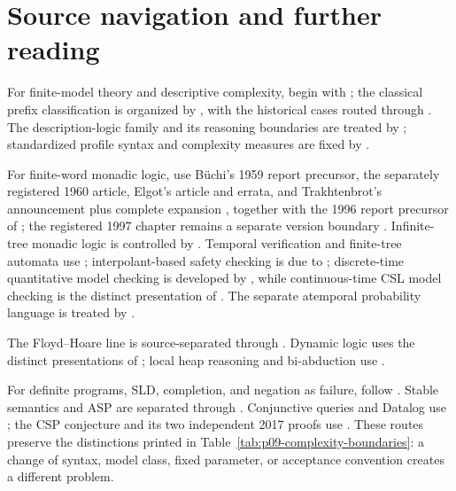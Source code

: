 \section{Source navigation and further reading}
\label{sec:p09-further-reading}

For finite-model theory and descriptive complexity, begin with
\textcite{EbbinghausFlum1995,Libkin2004,Immerman1999}; the classical prefix
classification is organized by \textcite{BorgerGradelGurevich1997}, with the
historical cases routed through \textcite{Lowenheim1915,Behmann1922}.  The
description-logic family and its reasoning boundaries are treated by
\textcite{BaaderEtAl2003,BaaderHorrocksLutzSattler2017}; standardized profile
syntax and complexity measures are fixed by \textcite{W3COWL2Profiles2012}.

For finite-word monadic logic, use B\"uchi's 1959 report precursor,
the separately registered 1960 article, Elgot's article and errata, and
Trakhtenbrot's announcement plus complete expansion
\parencite{Buchi1959WeakReport,Buchi1960,Elgot1961,Elgot1962Errata,
Trakhtenbrot1961,Trakhtenbrot1962Expanded}, together with the 1996 report
precursor of \textcite{Thomas1996Report}; the registered 1997 chapter
remains a separate version boundary \parencite{Thomas1997}.  Infinite-tree
monadic logic is controlled by
\textcite{Rabin1969}.  Temporal verification and finite-tree automata use
\textcite{ClarkeGrumbergPeled1999,ComonEtAl2007}; interpolant-based
safety checking is due to \textcite{McMillan2003}; discrete-time quantitative
model checking is developed by \textcite{BaierKatoen2008}, while continuous-time
CSL model checking is the distinct presentation of
\textcite{BaierHaverkortHermannsKatoen2003}.  The separate atemporal probability
language is treated by
\textcite{FaginHalpernMegiddo1990,Halpern2003}.

The Floyd--Hoare line is source-separated through
\textcite{Floyd1967,Hoare1969,Dijkstra1975,Cook1978,Apt1981}.  Dynamic logic
uses the distinct presentations of
\textcite{Pratt1976,FischerLadner1979,KozenParikh1981,HarelKozenTiuryn2000};
local heap reasoning and bi-abduction use
\textcite{OHearnReynoldsYang2001,ReynoldsSeparation2002,
CalcagnoDistefanoOHearnYang2011,OHearn2019}.

For definite programs, SLD, completion, and negation as failure, follow
\textcite{Kowalski1974,VanEmdenKowalski1976,Clark1978,AptVanEmden1982,Lloyd1987}.
Stable semantics and ASP are separated through
\textcite{GelfondLifschitz1988,MarekTruszczynski1999,
BrewkaEiterTruszczynski2011}.  Conjunctive queries and Datalog use
\textcite{ChandraMerlin1977,Vardi1982,AbiteboulHullVianu1995}; the CSP
conjecture and its two independent 2017 proofs use
\textcite{FederVardi1998,Bulatov2017,Zhuk2017}.
These routes preserve the distinctions printed in
Table~\ref{tab:p09-complexity-boundaries}: a change of syntax, model class,
fixed parameter, or acceptance convention creates a different problem.

